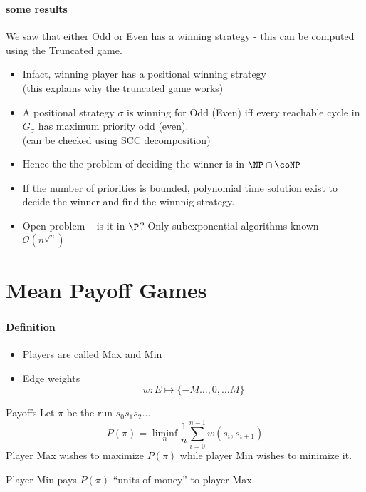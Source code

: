\documentclass{beamer}
\newenvironment{slide}
{\begin{frame}[environment=slide]
\frametitle{\insertsection}}
{\end{frame}}
\begin{document}
  \begin{slide}
      \framesubtitle{some results}
      We saw that either Odd or Even has a winning strategy - this can be computed using the Truncated game.
      \pause
      \begin{itemize}
          \item Infact, winning player has a positional winning strategy \\
              (this explains why the truncated game works)
          \item A positional strategy $\sigma$ is winning for Odd (Even) iff every reachable cycle in $G_{\sigma}$ has maximum priority odd (even).\\
              (can be checked using SCC decomposition)
          \item Hence the the problem of deciding the winner is in $\NP \cap \coNP$
          \pause
          \item If the number of priorities is bounded, polynomial time solution exist to decide the winner and find the winnnig strategy.
          \item \alert{Open problem} -- is it in $\P$? Only subexponential algorithms known - $\mathcal{O}(n^{\sqrt{n}})$
      \end{itemize}
  \end{slide}

  \section{Mean Payoff Games}

  \begin{slide}
      \framesubtitle{Definition}
      \begin{itemize}
          \item Players are called Max and Min
          \item Edge weights
              \[
                  w : E \mapsto \{-M \ldots, 0, \ldots M\}
              \]
      \end{itemize}
      \begin{block}{Payoffs}
         Let $\pi$ be the run $s_0s_1s_2\ldots$
         \[
             P(\pi) = \liminf_{n} \frac{1}{n}\sum_{i=0}^{n-1} w(s_i,s_{i+1})
         \]
         Player Max wishes to maximize $P(\pi)$ while player Min wishes to minimize it.
      \end{block}
      Player Min pays $P(\pi)$ ``units of money'' to player Max.
  \end{slide}
\end{document}

